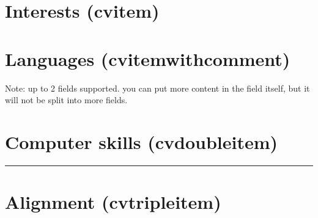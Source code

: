 \documentclass[10pt,a4paper,sans,colorlinks=true]{moderncv}        %
\begin{document}
\section{Interests (cvitem)}\label{interests-cvitem}





\section{Languages
(cvitemwithcomment)}\label{languages-cvitemwithcomment}





Note: up to 2 fields supported. you can put more content in the field
itself, but it will not be split into more fields.

\section{Computer skills
(cvdoubleitem)}\label{computer-skills-cvdoubleitem}



\begin{center}\rule{0.5\linewidth}{0.5pt}\end{center}




\section{Alignment (cvtripleitem)}\label{alignment-cvtripleitem}

\end{document}
